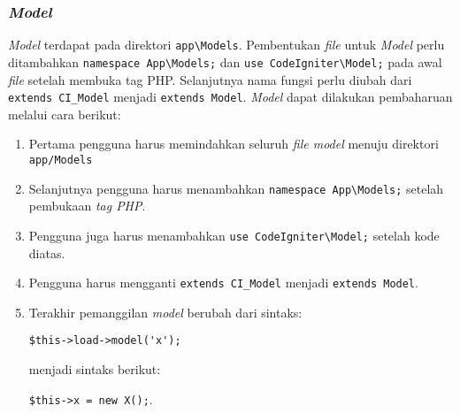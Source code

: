 \subsubsection{\textit{Model}}
\textit{Model} terdapat pada direktori \verb|app\Models|. Pembentukan \textit{file} untuk \textit{Model} perlu ditambahkan \verb|namespace App\Models;| dan \verb|use CodeIgniter\Model;| pada awal \textit{file} setelah membuka tag PHP. Selanjutnya nama fungsi perlu diubah dari \verb|extends CI_Model| menjadi \verb|extends Model|. \textit{Model} dapat dilakukan pembaharuan melalui cara berikut:
\begin{enumerate}
\item Pertama pengguna harus memindahkan seluruh \textit{file model} menuju direktori \verb|app/Models|
\item Selanjutnya pengguna harus menambahkan \verb|namespace App\Models;| setelah pembukaan \textit{tag PHP}.
\item Pengguna juga harus menambahkan \verb|use CodeIgniter\Model;| setelah kode diatas.
\item Pengguna harus mengganti \verb|extends CI_Model| menjadi \verb|extends Model|.
\item Terakhir pemanggilan \textit{model} berubah dari sintaks: 
\begin{center}
	\verb|$this->load->model('x');|
\end{center} 
	menjadi sintaks berikut:
\begin{center}
	\verb|$this->x = new X();|.
\end{center}
\end{enumerate}
 
